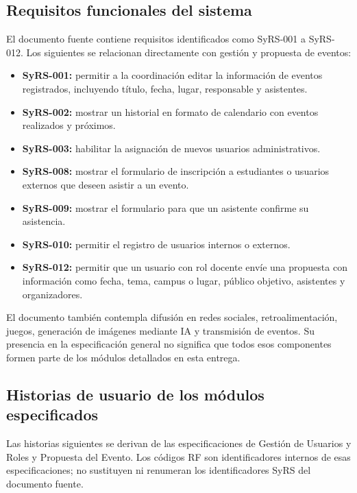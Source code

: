 \subsection{Requisitos funcionales del sistema}
El documento fuente contiene requisitos identificados como SyRS-001 a SyRS-012. Los siguientes se relacionan directamente con gestión y propuesta de eventos:
\begin{itemize}
\item \textbf{SyRS-001:} permitir a la coordinación editar la información de eventos registrados, incluyendo título, fecha, lugar, responsable y asistentes.
\item \textbf{SyRS-002:} mostrar un historial en formato de calendario con eventos realizados y próximos.
\item \textbf{SyRS-003:} habilitar la asignación de nuevos usuarios administrativos.
\item \textbf{SyRS-008:} mostrar el formulario de inscripción a estudiantes o usuarios externos que deseen asistir a un evento.
\item \textbf{SyRS-009:} mostrar el formulario para que un asistente confirme su asistencia.
\item \textbf{SyRS-010:} permitir el registro de usuarios internos o externos.
\item \textbf{SyRS-012:} permitir que un usuario con rol docente envíe una propuesta con información como fecha, tema, campus o lugar, público objetivo, asistentes y organizadores.
\end{itemize}
El documento también contempla difusión en redes sociales, retroalimentación, juegos, generación de imágenes mediante IA y transmisión de eventos. Su presencia en la especificación general no significa que todos esos componentes formen parte de los módulos detallados en esta entrega.

\subsection{Historias de usuario de los módulos especificados}
Las historias siguientes se derivan de las especificaciones de Gestión de Usuarios y Roles y Propuesta del Evento. Los códigos RF son identificadores internos de esas especificaciones; no sustituyen ni renumeran los identificadores SyRS del documento fuente.

